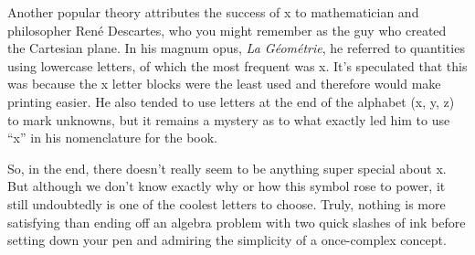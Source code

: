 \documentclass{article}
\begin{document}
Another popular theory attributes the success of x to mathematician and philosopher René Descartes, who you might remember as the guy who created the Cartesian plane. In his magnum opus, \textit{La Géométrie}, he referred to quantities using lowercase letters, of which the most frequent was x. It’s speculated that this was because the x letter blocks were the least used and therefore would make printing easier. He also tended to use letters at the end of the alphabet (x, y, z) to mark unknowns, but it remains a mystery as to what exactly led him to use ``x'' in his nomenclature for the book.

So, in the end, there doesn’t really seem to be anything super special about x. But although we don’t know exactly why or how this symbol rose to power, it still undoubtedly is one of the coolest letters to choose. Truly, nothing is more satisfying than ending off an algebra problem with two quick slashes of ink before setting down your pen and admiring the simplicity of a once-complex concept.
\end{document}
